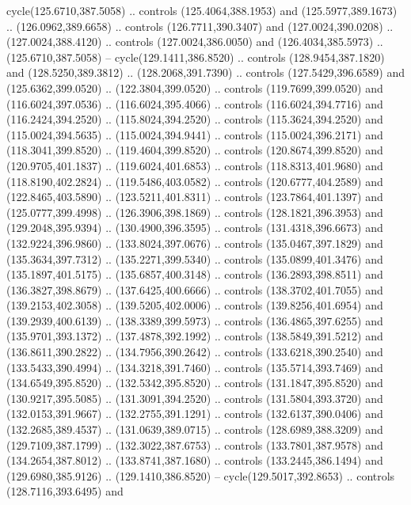 \begin{scope}[cm={{1.25,0.0,0.0,-1.25,(0.0,743.43331)}}]
    cycle(125.6710,387.5058) .. controls (125.4064,388.1953) and
    (125.5977,389.1673) .. (126.0962,389.6658) .. controls (126.7711,390.3407) and
    (127.0024,390.0208) .. (127.0024,388.4120) .. controls (127.0024,386.0050) and
    (126.4034,385.5973) .. (125.6710,387.5058) -- cycle(129.1411,386.8520) ..
    controls (128.9454,387.1820) and (128.5250,389.3812) .. (128.2068,391.7390) ..
    controls (127.5429,396.6589) and (125.6362,399.0520) .. (122.3804,399.0520) ..
    controls (119.7699,399.0520) and (116.6024,397.0536) .. (116.6024,395.4066) ..
    controls (116.6024,394.7716) and (116.2424,394.2520) .. (115.8024,394.2520) ..
    controls (115.3624,394.2520) and (115.0024,394.5635) .. (115.0024,394.9441) ..
    controls (115.0024,396.2171) and (118.3041,399.8520) .. (119.4604,399.8520) ..
    controls (120.8674,399.8520) and (120.9705,401.1837) .. (119.6024,401.6853) ..
    controls (118.8313,401.9680) and (118.8190,402.2824) .. (119.5486,403.0582) ..
    controls (120.6777,404.2589) and (122.8465,403.5890) .. (123.5211,401.8311) ..
    controls (123.7864,401.1397) and (125.0777,399.4998) .. (126.3906,398.1869) ..
    controls (128.1821,396.3953) and (129.2048,395.9394) .. (130.4900,396.3595) ..
    controls (131.4318,396.6673) and (132.9224,396.9860) .. (133.8024,397.0676) ..
    controls (135.0467,397.1829) and (135.3634,397.7312) .. (135.2271,399.5340) ..
    controls (135.0899,401.3476) and (135.1897,401.5175) .. (135.6857,400.3148) ..
    controls (136.2893,398.8511) and (136.3827,398.8679) .. (137.6425,400.6666) ..
    controls (138.3702,401.7055) and (139.2153,402.3058) .. (139.5205,402.0006) ..
    controls (139.8256,401.6954) and (139.2939,400.6139) .. (138.3389,399.5973) ..
    controls (136.4865,397.6255) and (135.9701,393.1372) .. (137.4878,392.1992) ..
    controls (138.5849,391.5212) and (136.8611,390.2822) .. (134.7956,390.2642) ..
    controls (133.6218,390.2540) and (133.5433,390.4994) .. (134.3218,391.7460) ..
    controls (135.5714,393.7469) and (134.6549,395.8520) .. (132.5342,395.8520) ..
    controls (131.1847,395.8520) and (130.9217,395.5085) .. (131.3091,394.2520) ..
    controls (131.5804,393.3720) and (132.0153,391.9667) .. (132.2755,391.1291) ..
    controls (132.6137,390.0406) and (132.2685,389.4537) .. (131.0639,389.0715) ..
    controls (128.6989,388.3209) and (129.7109,387.1799) .. (132.3022,387.6753) ..
    controls (133.7801,387.9578) and (134.2654,387.8012) .. (133.8741,387.1680) ..
    controls (133.2445,386.1494) and (129.6980,385.9126) .. (129.1410,386.8520) --
    cycle(129.5017,392.8653) .. controls (128.7116,393.6495) and

\end{scope}
